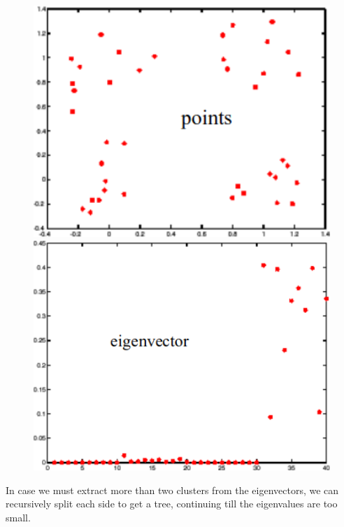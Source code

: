 \begin{figure}[H]
	\begin{minipage}[t]{0.49\linewidth} 
		\centering
		\includegraphics[width=1\textwidth]{img/eigenpoints}
	\end{minipage}        
	\hspace{1cm}
	\begin{minipage}[t]{0.49\linewidth} 
		\centering
		\includegraphics[width=1\textwidth]{img/eigenvectors}
	\end{minipage}
\end{figure}
In case we must extract more than two clusters from the eigenvectors, we can recursively split each side to get a tree, continuing till the eigenvalues are too small. 
